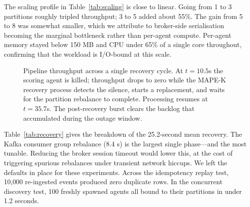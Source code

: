 \documentclass[runningheads]{llncs}
\begin{document}
The scaling profile in Table~\ref{tab:scaling} is close to linear. Going from 1 to 3 partitions roughly tripled throughput; 3 to 5 added about 55\%. The gain from 5 to 8 was somewhat smaller, which we attribute to broker-side serialisation becoming the marginal bottleneck rather than per-agent compute. Per-agent memory stayed below 150 MB and CPU under 65\% of a single core throughout, confirming that the workload is I/O-bound at this scale.

\begin{figure}[ht]
\centering
{}
\caption{Pipeline throughput across a single recovery cycle. At $t{=}10.5$s the scoring agent is killed; throughput drops to zero while the MAPE-K recovery process detects the silence, starts a replacement, and waits for the partition rebalance to complete. Processing resumes at $t{=}35.7$s. The post-recovery burst clears the backlog that accumulated during the outage window.}
\label{fig:recovery}
\end{figure}

Table~\ref{tab:recovery} gives the breakdown of the 25.2-second mean recovery. The Kafka consumer group rebalance (8.4 s) is the largest single phase---and the most tunable. Reducing the broker session timeout would lower this, at the cost of triggering spurious rebalances under transient network hiccups. We left the defaults in place for these experiments. Across the idempotency replay test, 10,000 re-ingested events produced zero duplicate rows. In the concurrent discovery test, 100 freshly spawned agents all bound to their partitions in under 1.2 seconds.
\end{document}

